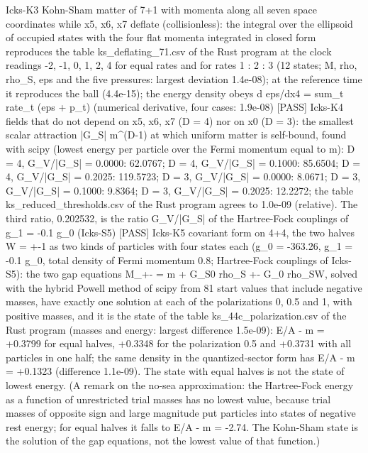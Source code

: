 \documentclass[
  10pt,
]{article}
\newenvironment{Shaded}{}{}
\newcommand{\NormalTok}[1]{#1}
\begin{document}
\begin{Shaded}
\begin{Highlighting}[]
\NormalTok{[PASS] Icks{-}K3  Kohn{-}Sham matter of 7+1 with momenta along all seven space coordinates while x5, x6, x7 deflate (collisionless): the integral over the ellipsoid of occupied states with the four flat momenta integrated in closed form reproduces the table ks\_deflating\_71.csv of the Rust program at the clock readings {-}2, {-}1, 0, 1, 2, 4 for equal rates and for rates 1 : 2 : 3 (12 states; M, rho, rho\_S, eps and the five pressures: largest deviation 1.4e{-}08); at the reference time it reproduces the ball (4.4e{-}15); the energy density obeys d eps/dx4 = sum\_t rate\_t (eps + p\_t) (numerical derivative, four cases: 1.9e{-}08)}
\NormalTok{[PASS] Icks{-}K4  fields that do not depend on x5, x6, x7 (D = 4) nor on x0 (D = 3): the smallest scalar attraction |G\_S| m\^{}(D{-}1) at which uniform matter is self{-}bound, found with scipy (lowest energy per particle over the Fermi momentum equal to m): D = 4, G\_V/|G\_S| = 0.0000: 62.0767; D = 4, G\_V/|G\_S| = 0.1000: 85.6504; D = 4, G\_V/|G\_S| = 0.2025: 119.5723; D = 3, G\_V/|G\_S| = 0.0000: 8.0671; D = 3, G\_V/|G\_S| = 0.1000: 9.8364; D = 3, G\_V/|G\_S| = 0.2025: 12.2272; the table ks\_reduced\_thresholds.csv of the Rust program agrees to 1.0e{-}09 (relative). The third ratio, 0.202532, is the ratio G\_V/|G\_S| of the Hartree{-}Fock couplings of g\_1 = {-}0.1 g\_0 (Icks{-}S5)}
\NormalTok{[PASS] Icks{-}K5  covariant form on 4+4, the two halves W = +{-}1 as two kinds of particles with four states each (g\_0 = {-}363.26, g\_1 = {-}0.1 g\_0, total density of Fermi momentum 0.8; Hartree{-}Fock couplings of Icks{-}S5): the two gap equations M\_+{-} = m + G\_S0 rho\_S +{-} G\_0 rho\_SW, solved with the hybrid Powell method of scipy from 81 start values that include negative masses, have exactly one solution at each of the polarizations 0, 0.5 and 1, with positive masses, and it is the state of the table ks\_44c\_polarization.csv of the Rust program (masses and energy: largest difference 1.5e{-}09): E/A {-} m = +0.3799 for equal halves, +0.3348 for the polarization 0.5 and +0.3731 with all particles in one half; the same density in the quantized{-}sector form has E/A {-} m = +0.1323 (difference 1.1e{-}09). The state with equal halves is not the state of lowest energy. (A remark on the no{-}sea approximation: the Hartree{-}Fock energy as a function of unrestricted trial masses has no lowest value, because trial masses of opposite sign and large magnitude put particles into states of negative rest energy; for equal halves it falls to E/A {-} m = {-}2.74. The Kohn{-}Sham state is the solution of the gap equations, not the lowest value of that function.)}

\end{Highlighting}
\end{Shaded}
\end{document}
